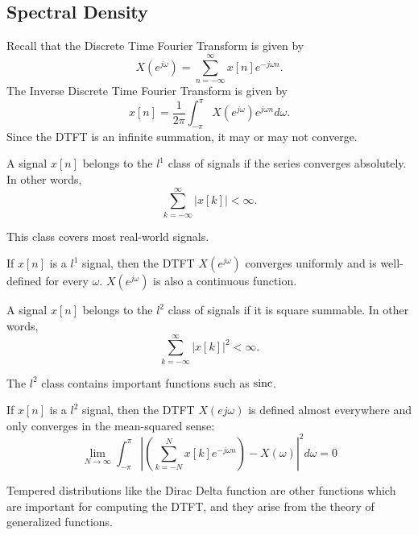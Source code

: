 \subsection{Spectral Density}
Recall that the Discrete Time Fourier Transform is given by \[
	X(e^{j\omega}) = \sum_{n=-\infty}^{\infty}x[n]e^{-j\omega n}.
\]
The Inverse Discrete Time Fourier Transform is given by \[
	x[n] = \frac{1}{2\pi}\int_{-\pi}^{\pi}X(e^{j\omega})e^{j\omega n}d\omega.
\]
Since the DTFT is an infinite summation, it may or may not converge.
\begin{definition}
	A signal $x[n]$ belongs to the $l^1$ class of signals if the series converges absolutely. In other words,
	\[
		\sum_{k=-\infty}^{\infty}|x[k]| < \infty.
	\]
	\label{defn:l1-class}
\end{definition}
This class covers most real-world signals.
\begin{theorem}
	If $x[n]$ is a $l^1$ signal, then the DTFT $X(e^{j\omega})$ converges uniformly and is well-defined for every $\omega$. $X(e^{j\omega})$ is also a continuous function.
	\label{thm:l1-dtft}
\end{theorem}
\begin{definition}
	A signal $x[n]$ belongs to the $l^2$ class of signals if it is square summable. In other words,
	\[
		\sum_{k=-\infty}^{\infty}|x[k]|^2 < \infty.
	\]
	\label{defn:l2-class}
\end{definition}
The $l^2$ class contains important functions such as $\operatorname*{sinc}$.
\begin{theorem}
	If $x[n]$ is a $l^2$ signal, then the DTFT $X(e{j\omega})$ is defined almost everywhere and only converges in the mean-squared sense:
	\[
		\lim_{N\to\infty} \int_{-\pi}^{\pi}\left|\left(\sum_{k=-N}^N x[k]e^{-j\omega n}\right) - X(\omega)\right|^2d\omega = 0
	\]
	\label{thm:l2-dtft}
\end{theorem}
Tempered distributions like the Dirac Delta function are other functions which are important for computing the DTFT, and they arise from the theory of generalized functions.

